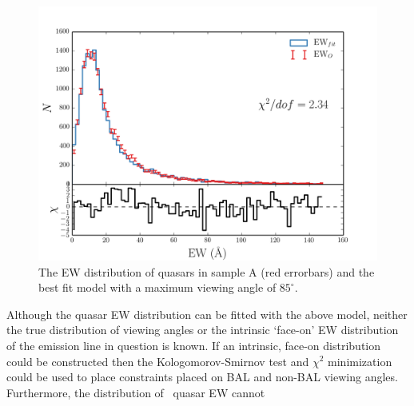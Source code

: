 \begin{figure}
\centering
\includegraphics[width=1.0\textwidth]{figures/ewpaper/quasar_fit.png}
\caption
{
The EW distribution of quasars in sample A (red errorbars)
and the best fit model with a maximum viewing angle of
$85^\circ$.
}
\label{fig:chi2}
\end{figure}

Although the quasar EW distribution can be fitted with the above 
model, neither the true distribution of viewing angles 
or the intrinsic `face-on' EW distribution of the emission line in 
question is known. If an intrinsic, face-on distribution could be constructed
then the Kologomorov-Smirnov test and $\chi^2$ minimization could be used
to place constraints placed on BAL and non-BAL viewing angles.
Furthermore, the distribution of \civ\ quasar EW cannot 



